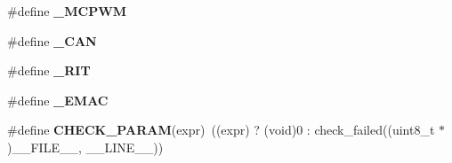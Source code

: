 \begin{DoxyCompactItemize}
\item 
\hypertarget{group___l_i_b_c_f_g___d_e_f_a_u_l_t___public___macros_ga6b0722ccc375100d893cc30ebb1d8680}{\#define {\bfseries \-\_\-\-M\-C\-P\-W\-M}}\label{group___l_i_b_c_f_g___d_e_f_a_u_l_t___public___macros_ga6b0722ccc375100d893cc30ebb1d8680}

\item 
\hypertarget{group___l_i_b_c_f_g___d_e_f_a_u_l_t___public___macros_gaa8e7a69f3c23b92c6590120df9fd2fdc}{\#define {\bfseries \-\_\-\-C\-A\-N}}\label{group___l_i_b_c_f_g___d_e_f_a_u_l_t___public___macros_gaa8e7a69f3c23b92c6590120df9fd2fdc}

\item 
\hypertarget{group___l_i_b_c_f_g___d_e_f_a_u_l_t___public___macros_ga8b29bd3c5cb4c0c0fba8799e4bff0ee5}{\#define {\bfseries \-\_\-\-R\-I\-T}}\label{group___l_i_b_c_f_g___d_e_f_a_u_l_t___public___macros_ga8b29bd3c5cb4c0c0fba8799e4bff0ee5}

\item 
\hypertarget{group___l_i_b_c_f_g___d_e_f_a_u_l_t___public___macros_ga935f73849db3ac33f3ba59b300984f34}{\#define {\bfseries \-\_\-\-E\-M\-A\-C}}\label{group___l_i_b_c_f_g___d_e_f_a_u_l_t___public___macros_ga935f73849db3ac33f3ba59b300984f34}

\item 
\hypertarget{group___l_i_b_c_f_g___d_e_f_a_u_l_t___public___macros_ga9d8414ced01feedb3238e5ffb3c1961f}{\#define {\bfseries \-C\-H\-E\-C\-K\-\_\-\-P\-A\-R\-A\-M}(expr)~((expr) ? (void)0 \-: check\-\_\-failed((uint8\-\_\-t $\ast$)\-\_\-\-\_\-\-F\-I\-L\-E\-\_\-\-\_\-, \-\_\-\-\_\-\-L\-I\-N\-E\-\_\-\-\_\-))}\label{group___l_i_b_c_f_g___d_e_f_a_u_l_t___public___macros_ga9d8414ced01feedb3238e5ffb3c1961f}

\end{DoxyCompactItemize}
